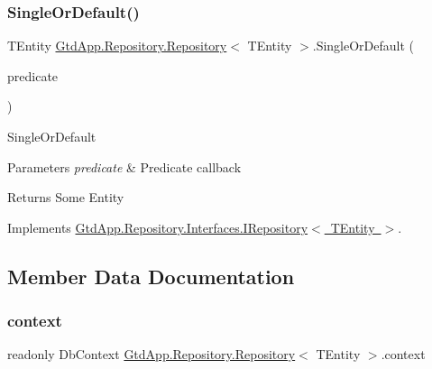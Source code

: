 \mbox{\label{class_gtd_app_1_1_repository_1_1_repository_a5e3d1bdfdf567227d337af334954cf45}} 
\subsubsection{\texorpdfstring{Single\+Or\+Default()}{SingleOrDefault()}}
{\footnotesize\ttfamily T\+Entity \mbox{\hyperlink{class_gtd_app_1_1_repository_1_1_repository}{Gtd\+App.\+Repository.\+Repository}}$<$ T\+Entity $>$.Single\+Or\+Default (\begin{DoxyParamCaption}\item[{Expression$<$ Func$<$ T\+Entity, bool $>$$>$}]{predicate }\end{DoxyParamCaption})}



Single\+Or\+Default 


\begin{DoxyParams}{Parameters}
{\em predicate} & Predicate callback\\
\hline
\end{DoxyParams}
\begin{DoxyReturn}{Returns}
Some Entity
\end{DoxyReturn}


Implements \mbox{\hyperlink{interface_gtd_app_1_1_repository_1_1_interfaces_1_1_i_repository_a82a2f97d2651121365bb7975974dc4a4}{Gtd\+App.\+Repository.\+Interfaces.\+I\+Repository$<$ T\+Entity $>$}}.



\subsection{Member Data Documentation}
\mbox{\label{class_gtd_app_1_1_repository_1_1_repository_a693057a1b8acd4c3778c183440feed41}} 
\subsubsection{\texorpdfstring{context}{context}}
{\footnotesize\ttfamily readonly Db\+Context \mbox{\hyperlink{class_gtd_app_1_1_repository_1_1_repository}{Gtd\+App.\+Repository.\+Repository}}$<$ T\+Entity $>$.context\hspace{0.3cm}{\ttfamily [private]}}



